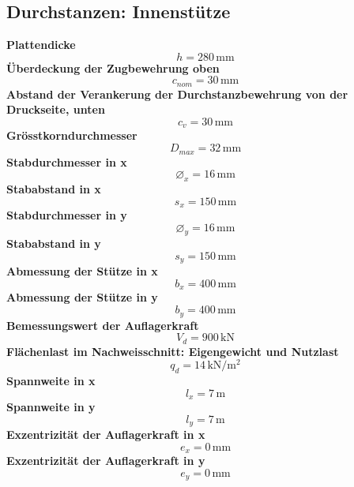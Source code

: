 \documentclass[11pt,a4paper]{article}
\begin{document}
\subsection{Durchstanzen: Innenstütze}
\noindent\textbf{Plattendicke}
\begin{equation*}
h = 280\,\mathrm{mm}
\end{equation*}
\noindent\textbf{Überdeckung der Zugbewehrung oben}
\begin{equation*}
c_{nom} = 30\,\mathrm{mm}
\end{equation*}
\noindent\textbf{Abstand der Verankerung der Durchstanzbewehrung von der Druckseite, unten}
\begin{equation*}
c_v = 30\,\mathrm{mm}
\end{equation*}
\noindent\textbf{Grösstkorndurchmesser}
\begin{equation*}
D_{max} = 32\,\mathrm{mm}
\end{equation*}
\noindent\textbf{Stabdurchmesser in x}
\begin{equation*}
\varnothing_x = 16\,\mathrm{mm}
\end{equation*}
\noindent\textbf{Stababstand in x}
\begin{equation*}
s_x = 150\,\mathrm{mm}
\end{equation*}
\noindent\textbf{Stabdurchmesser in y}
\begin{equation*}
\varnothing_y = 16\,\mathrm{mm}
\end{equation*}
\noindent\textbf{Stababstand in y}
\begin{equation*}
s_y = 150\,\mathrm{mm}
\end{equation*}
\noindent\textbf{Abmessung der Stütze in x}
\begin{equation*}
b_x = 400\,\mathrm{mm}
\end{equation*}
\noindent\textbf{Abmessung der Stütze in y}
\begin{equation*}
b_y = 400\,\mathrm{mm}
\end{equation*}
\noindent\textbf{Bemessungswert der Auflagerkraft}
\begin{equation*}
V_d = 900\,\mathrm{kN}
\end{equation*}
\noindent\textbf{Flächenlast im Nachweisschnitt: Eigengewicht und Nutzlast}
\begin{equation*}
q_d = 14\,\mathrm{kN}/\mathrm{m}^{2}
\end{equation*}
\noindent\textbf{Spannweite in x}
\begin{equation*}
l_x = 7\,\mathrm{m}
\end{equation*}
\noindent\textbf{Spannweite in y}
\begin{equation*}
l_y = 7\,\mathrm{m}
\end{equation*}
\noindent\textbf{Exzentrizität der Auflagerkraft in x}
\begin{equation*}
e_x = 0\,\mathrm{mm}
\end{equation*}
\noindent\textbf{Exzentrizität der Auflagerkraft in y}
\begin{equation*}
e_y = 0\,\mathrm{mm}
\end{equation*}
\end{document}
